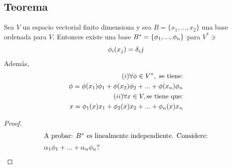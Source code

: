 \documentclass[11pt,fleqn]{book} %
\begin{document}
\subsection{Teorema}
\begin{theorem}
Sea $V$ un espacio vectorial finito dimensiona y sea $B=\{x_1,...,x_2\}$ una base ordenada para $V$. Entonces existe una base $B^* = \{\phi_1,...,\phi_n \}$ para $V^* \ni$ $$\phi_i(x_j)=\delta_ij$$
Además, 
\begin{align}
    (i) \forall \phi \in V^*, \text{ se tiene:}\\
    \phi =\phi(x_1)\phi_1+\phi(x_2)\phi_2+...+\phi(x_n)\phi_n\\
    (ii) \forall x \in V, \text{se tiene que:}\\
    x=\phi_1(x)x_1+\phi_2(x)x_2+...+\phi_n(x)x_n\\
\end{align}
\end{theorem}
\begin{proof}
\begin{align}
    \intertext{A probar: $B^*$ es linealmente independiente. Considere:}
    \alpha_1\phi_1+...+\alpha_n\phi_n ?
\end{align}
\end{proof}



\cleardoublepage %
\setlength{\columnsep}{0.75cm} %
\printindex %

\end{document}
